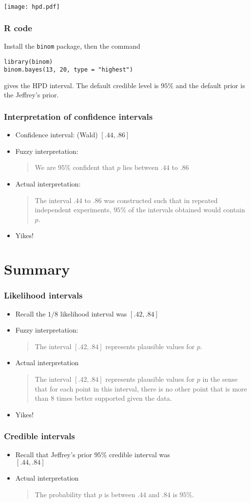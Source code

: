 \documentclass[aspectratio=169]{beamer}
\begin{document}
\begin{frame}
\texttt{[image: hpd.pdf]}
\end{frame}


\begin{frame}[fragile]\frametitle{R code}
Install the \texttt{binom} package, then the command
\begin{verbatim}
library(binom)
binom.bayes(13, 20, type = "highest")
\end{verbatim}
gives the HPD interval. The default credible level is $95\%$ and
the default prior is the Jeffrey's prior.
\end{frame}

\begin{frame}\frametitle{Interpretation of confidence intervals}
\begin{itemize}
\item Confidence interval: (Wald) $[.44, .86]$
\item Fuzzy interpretation: 
  \begin{quote}
We are 95\% confident that $p$ lies between $.44$ to $.86$    
  \end{quote}
\item Actual interpretation: 
  \begin{quote}
    The interval $.44$ to $.86$ was constructed such that in repeated
    independent experiments, $95\%$ of the intervals obtained would
    contain $p$.
  \end{quote}
\item Yikes!
\end{itemize}
\end{frame}

\section{Summary}
\begin{frame}\frametitle{Likelihood intervals}
\begin{itemize}
\item Recall the $1/8$ likelihood interval was $[.42, .84]$
\item Fuzzy interpretation:
  \begin{quote}
    The interval $[.42, .84]$ represents plausible values for $p$.
  \end{quote}
\item Actual interpretation
  \begin{quote}
    The interval $[.42, .84]$ represents plausible values for $p$ in
    the sense that for each point in this interval, there is no
    other point that is more than $8$ times better supported given the data.
  \end{quote}
\item Yikes!
\end{itemize}
\end{frame}

\begin{frame}\frametitle{Credible intervals}
\begin{itemize}
\item Recall that Jeffrey's prior $95\%$ credible interval was \\$[.44, .84]$
\item Actual interpretation
  \begin{quote}
    The probability that $p$ is between $.44$ and $.84$ is $95\%$.
  \end{quote}
\end{itemize}
\end{frame}
\end{document}
